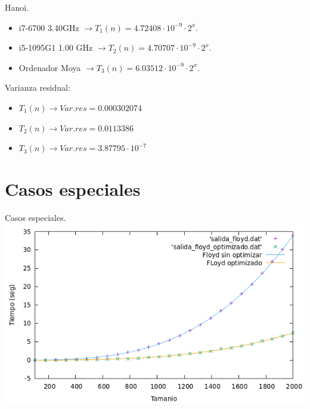 \documentclass[10pt, xcolor=table]{beamer}
\begin{document}
\begin{frame}[fragile]{Hanoi.
}
\begin{itemize}
	\item i7-6700 3.40GHz \(\rightarrow T_1(n) = 4.72408 \cdot 10^{-9} \cdot 2^x\).
	\item i5-1095G1 1.00 GHz \(\rightarrow T_2(n) = 4.70707 \cdot 10^{-9} \cdot 2^x\).
	\item Ordenador Moya \(\rightarrow T_3(n) = 6.03512 \cdot 10^{-9} \cdot 2^x\).
\end{itemize}

Varianza residual:
\begin{itemize}
	\item \(T_1(n) \longrightarrow Var.res = 0.000302074\)
	\item \(T_2(n) \longrightarrow Var.res = 0.0113386\)
	\item \(T_3(n) \longrightarrow Var.res = 3.87795 \cdot 10^{-7}\)
\end{itemize}
\end{frame}

\section{Casos especiales}

\begin{frame}[fragile]{Casos especiales.
}
\centering
\includegraphics[scale=0.4]{../../Images/floyd_opt_Javi5454.png} \\
\end{frame}
\end{document}
